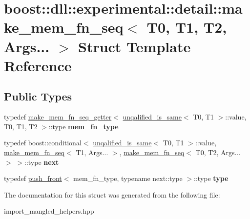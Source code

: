 \hypertarget{a01504}{}\section{boost\+:\+:dll\+:\+:experimental\+:\+:detail\+:\+:make\+\_\+mem\+\_\+fn\+\_\+seq$<$ T0, T1, T2, Args... $>$ Struct Template Reference}
\label{a01504}
\subsection*{Public Types}
\begin{DoxyCompactItemize}
\item 
\mbox{\label{a01504_af17ba7fcbbb91b95950b5deaa88ffefa}} 
typedef \hyperlink{a01484}{make\+\_\+mem\+\_\+fn\+\_\+seq\+\_\+getter}$<$ \hyperlink{a01444}{unqalified\+\_\+is\+\_\+same}$<$ T0, T1 $>$\+::value, T0, T1, T2 $>$\+::type {\bfseries mem\+\_\+fn\+\_\+type}
\item 
\mbox{\label{a01504_a65d38d57fd7410f8455cc06babbc0cfc}} 
typedef boost\+::conditional$<$ \hyperlink{a01444}{unqalified\+\_\+is\+\_\+same}$<$ T0, T1 $>$\+::value, \hyperlink{a01480}{make\+\_\+mem\+\_\+fn\+\_\+seq}$<$ T1, Args... $>$, \hyperlink{a01480}{make\+\_\+mem\+\_\+fn\+\_\+seq}$<$ T0, T2, Args... $>$ $>$\+::type {\bfseries next}
\item 
\mbox{\label{a01504_a8a88cbd91c8e39bf89ce45f3aecc66d7}} 
typedef \hyperlink{a01436}{push\+\_\+front}$<$ mem\+\_\+fn\+\_\+type, typename next\+::type $>$\+::type {\bfseries type}
\end{DoxyCompactItemize}


The documentation for this struct was generated from the following file\+:\begin{DoxyCompactItemize}
\item 
import\+\_\+mangled\+\_\+helpers.\+hpp\end{DoxyCompactItemize}
